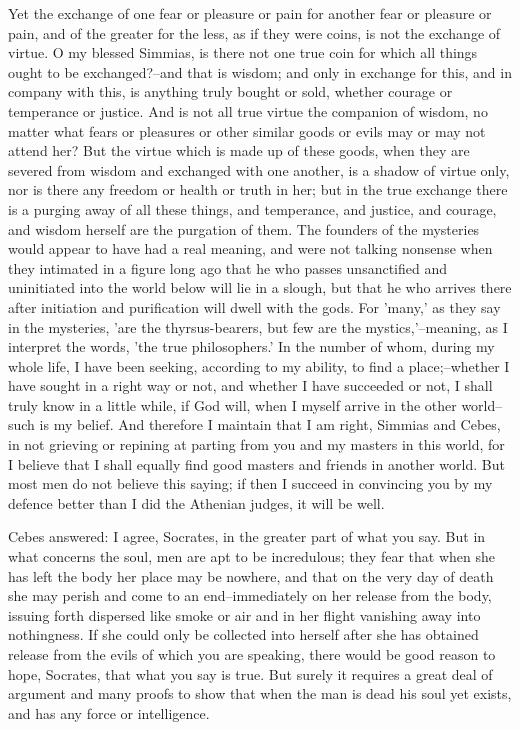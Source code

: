 Yet the exchange of one fear or pleasure or pain for another fear or
pleasure or pain, and of the greater for the less, as if they were
coins, is not the exchange of virtue. O my blessed Simmias, is there not
one true coin for which all things ought to be exchanged?--and that
is wisdom; and only in exchange for this, and in company with this, is
anything truly bought or sold, whether courage or temperance or justice.
And is not all true virtue the companion of wisdom, no matter what fears
or pleasures or other similar goods or evils may or may not attend her?
But the virtue which is made up of these goods, when they are severed
from wisdom and exchanged with one another, is a shadow of virtue only,
nor is there any freedom or health or truth in her; but in the true
exchange there is a purging away of all these things, and temperance,
and justice, and courage, and wisdom herself are the purgation of them.
The founders of the mysteries would appear to have had a real meaning,
and were not talking nonsense when they intimated in a figure long ago
that he who passes unsanctified and uninitiated into the world below
will lie in a slough, but that he who arrives there after initiation and
purification will dwell with the gods. For 'many,' as they say in the
mysteries, 'are the thyrsus-bearers, but few are the mystics,'--meaning,
as I interpret the words, 'the true philosophers.' In the number
of whom, during my whole life, I have been seeking, according to my
ability, to find a place;--whether I have sought in a right way or not,
and whether I have succeeded or not, I shall truly know in a little
while, if God will, when I myself arrive in the other world--such is my
belief. And therefore I maintain that I am right, Simmias and Cebes,
in not grieving or repining at parting from you and my masters in this
world, for I believe that I shall equally find good masters and friends
in another world. But most men do not believe this saying; if then I
succeed in convincing you by my defence better than I did the Athenian
judges, it will be well.

Cebes answered: I agree, Socrates, in the greater part of what you say.
But in what concerns the soul, men are apt to be incredulous; they fear
that when she has left the body her place may be nowhere, and that on
the very day of death she may perish and come to an end--immediately on
her release from the body, issuing forth dispersed like smoke or air
and in her flight vanishing away into nothingness. If she could only be
collected into herself after she has obtained release from the evils of
which you are speaking, there would be good reason to hope, Socrates,
that what you say is true. But surely it requires a great deal of
argument and many proofs to show that when the man is dead his soul yet
exists, and has any force or intelligence.

